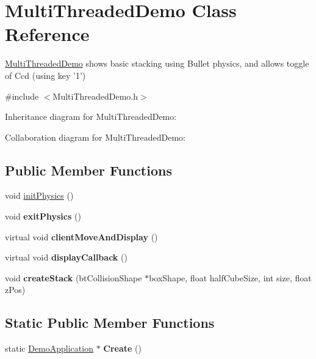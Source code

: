 \hypertarget{class_multi_threaded_demo}{\section{Multi\+Threaded\+Demo Class Reference}
\label{class_multi_threaded_demo}
}


\hyperlink{class_multi_threaded_demo}{Multi\+Threaded\+Demo} shows basic stacking using Bullet physics, and allows toggle of Ccd (using key '1')  




{\ttfamily \#include $<$Multi\+Threaded\+Demo.\+h$>$}



Inheritance diagram for Multi\+Threaded\+Demo\+:


Collaboration diagram for Multi\+Threaded\+Demo\+:
\subsection*{Public Member Functions}
\begin{DoxyCompactItemize}
\item 
void \hyperlink{class_multi_threaded_demo_a199850b9adaeeefd2deef7225e4cdaa6}{init\+Physics} ()
\item 
\hypertarget{class_multi_threaded_demo_a26e296f0e2dfd6ce25e2115f9fed85ba}{void {\bfseries exit\+Physics} ()}\label{class_multi_threaded_demo_a26e296f0e2dfd6ce25e2115f9fed85ba}

\item 
\hypertarget{class_multi_threaded_demo_ac910340fa9cd366f96008b8150401bbd}{virtual void {\bfseries client\+Move\+And\+Display} ()}\label{class_multi_threaded_demo_ac910340fa9cd366f96008b8150401bbd}

\item 
\hypertarget{class_multi_threaded_demo_a8a05563b821a7510bd3769791cf174e4}{virtual void {\bfseries display\+Callback} ()}\label{class_multi_threaded_demo_a8a05563b821a7510bd3769791cf174e4}

\item 
\hypertarget{class_multi_threaded_demo_a1eae129c6b49445c584b184ca5aa646e}{void {\bfseries create\+Stack} (bt\+Collision\+Shape $\ast$box\+Shape, float half\+Cube\+Size, int size, float z\+Pos)}\label{class_multi_threaded_demo_a1eae129c6b49445c584b184ca5aa646e}

\end{DoxyCompactItemize}
\subsection*{Static Public Member Functions}
\begin{DoxyCompactItemize}
\item 
\hypertarget{class_multi_threaded_demo_a0868a4f2faca7fe4ff776ff0f462aa85}{static \hyperlink{class_demo_application}{Demo\+Application} $\ast$ {\bfseries Create} ()}\label{class_multi_threaded_demo_a0868a4f2faca7fe4ff776ff0f462aa85}

\end{DoxyCompactItemize}


